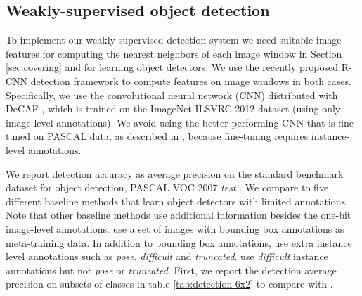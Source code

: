 \documentclass{article}
\begin{document}
\subsection{Weakly-supervised object detection}

To implement our weakly-supervised detection system we need suitable image features for computing the nearest neighbors of each image window in Section \ref{sec:covering} and for learning object detectors.
We use the recently proposed R-CNN \cite{girshick2014rcnn} detection framework to compute features on image windows in both cases. Specifically, we use the convolutional neural network (CNN) distributed with DeCAF \cite{decafICML}, which is trained on the ImageNet ILSVRC 2012 dataset (using only image-level annotations).
We avoid using the better performing CNN that is fine-tuned on PASCAL data, as described in \cite{girshick2014rcnn}, because fine-tuning requires instance-level annotations. 

We report detection accuracy as average precision on the standard benchmark dataset for object detection, PASCAL VOC 2007 \emph{test} \cite{PASCAL07}. We compare to five different baseline methods that learn object detectors with limited annotations. Note that other baseline methods use additional information besides the one-bit image-level annotations. \citet{deselaers1, deselaers2} use a set of  images with bounding box annotations as meta-training data. In addition to bounding box annotations, \citet{deselaers1, deselaers2, pandey} use extra instance level annotations such as \emph{pose}, \emph{difficult} and \emph{truncated}. \citet{siva2012defence,russakovsky} use \emph{difficult} instance annotations but not \emph{pose} or \emph{truncated}. First, we report the detection average precision on  subsets of classes in table \ref{tab:detection-6x2} to compare with \citet{deselaers1, deselaers2, pandey}. 
 
\end{document}
